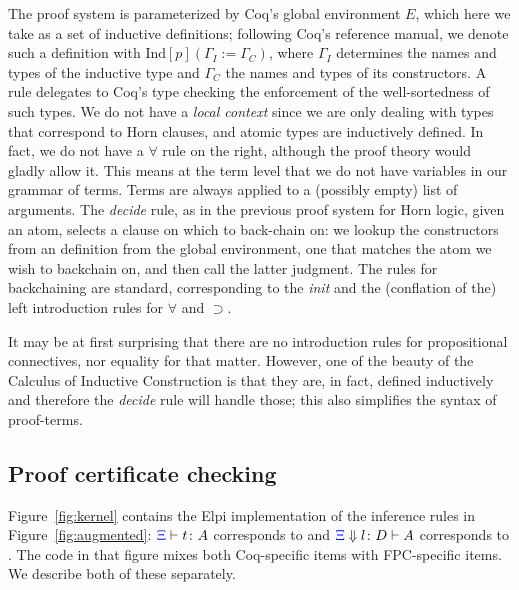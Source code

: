 The proof system is parameterized by Coq's global environment $E$,
which here we take as a set of inductive definitions; following Coq's
reference manual, we denote such a definition with
$\mathrm{Ind}[p] (\Gamma_I := \Gamma_C)$, where $\Gamma_I$ determines
the names and types of the inductive type and $\Gamma_C$ the names
and types of its constructors. A rule delegates to Coq's
type checking the enforcement of the well-sortedness of such types. We
do not have a \emph{local context} since we are only dealing with
types that correspond to Horn clauses, and atomic types are
inductively defined. In fact, we do not have a $\forall$ rule on the
right, although the proof theory would gladly allow it. This means at
the term level that we do not have variables in our grammar of
terms. Terms are always applied to a (possibly empty) list of
arguments.  The \emph{decide} rule, %
as in the previous proof system for Horn logic,  given an atom,
 selects a clause on which to back-chain on: we lookup the
constructors from an  definition from the global
environment, one that matches the atom we wish to backchain on, and then
call the latter judgment. The rules for backchaining are standard,
corresponding to the \emph{init} and the (conflation of the) left introduction rules for
$\forall$ and $\supset$.

It may be at first surprising that there are no
introduction rules for propositional connectives, nor equality for
that matter. However, one of the beauty of the Calculus of Inductive
Construction is that they are, in fact,  defined inductively and
therefore the \emph{decide} rule will handle those; this also
simplifies the syntax of proof-terms.

\subsection{Proof certificate checking}
\label{ssec:cert}
Figure~\ref{fig:kernel} contains the Elpi implementation of the
inference rules in Figure~\ref{fig:augmented}: ${\color{blue}{\Xi}}\vdash t \colon A$ corresponds to
 and ${\color{blue}{\Xi}} \Downarrow  l \colon D\vdash A$ corresponds to
.
%
The code in that figure mixes both Coq-specific items with
FPC-specific items.  We describe both of these separately.

